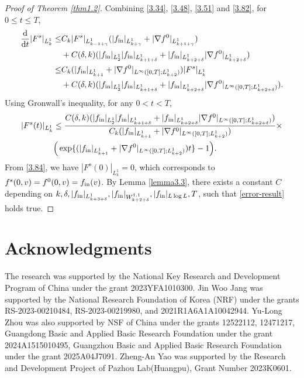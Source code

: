 \documentclass[reqno,10pt]{amsart}
\def\grad{\nabla}
\newcommand{\beq}{\begin{equation}}
\newcommand{\eeq}{\end{equation}}
\newcommand{\ben}{\begin{eqnarray}}
\newcommand{\een}{\end{eqnarray}}
\theoremstyle{definition}
\numberwithin{equation}{section}
\begin{document}
\begin{proof}[Proof of Theorem \ref{thm1.2}]
Combining \eqref{3.34}, \eqref{3.48}, \eqref{3.51} and \eqref{3.82}, for $0\le t\le T$,
$$
\begin{aligned}
\frac{\mathrm{d}}{\mathrm{d}t}|F^s|_{L^1_k}\le &C_k|F^s|_{L^1_{k-1+\gamma}}(|f_{\textup{in}}|_{L^1_{k+\gamma}}+|\grad f^0|_{L^1_{k+1+\gamma}})\\
&+C(\delta,k)(|f_{\textup{in}}|_{L^1_2}|f_{\textup{in}}|_{L^1_{k+1+\delta}}+|f_{\textup{in}}|_{L^1_{k+2+\delta}}|\grad f^0|_{L^1_{k+2+\delta}})\\
\le &
C_k(|f_{\textup{in}}|_{L^1_{k+1}}+|\grad f^0|_{L^{\infty}([0,T];L^1_{k+2})})|F^s|_{L^1_k}\\
&+C(\delta,k)(|f_{\textup{in}}|_{L^1_2}|f_{\textup{in}}|_{L^1_{k+1+\delta}}+|f_{\textup{in}}|_{L^1_{k+2+\delta}}|\grad f^0|_{L^\infty([0,T];L^1_{k+2+\delta})}).
\end{aligned}
$$
Using Gronwall's inequality, for any $0<t<T$,
\beq\label{3.84}
\begin{aligned}
|F^s(t)|_{L^1_k}&\le \frac{C(\delta,k)(|f_{\textup{in}}|_{L^1_2}|f_{\textup{in}}|_{L^1_{k+1+\delta}}+|f_{\textup{in}}|_{L^1_{k+2+\delta}}|\grad f^0|_{L^\infty([0,T];L^1_{k+2+\delta})})}{C_k(|f_{\textup{in}}|_{L^1_{k+1}}+|\grad f^0|_{L^{\infty}([0,T];L^1_{k+2})})}\times\\
&\Big(\exp\{(|f_{\textup{in}}|_{L^1_{k+1}}+|\grad f^0|_{L^{\infty}([0,T];L^1_{k+2})})t\}-1\Big).
\end{aligned}
\eeq
From \eqref{3.84}, we have $|F^s(0)|_{L^1_k}=0$, which corresponds to $f^s(0,v)=f^0(0,v)=f_{\textup{in}}(v)$.
By Lemma \ref{lemma3.3}, there exists a constant $C$ depending on $k,\delta,|f_{\textup{in}}|_{L^1_{k+3+\delta}},|f_{\textup{in}}|_{W^{1,1}_{k+2+\delta}},|f_{\textup{in}}|_{L\log L},T$, such that \eqref{error-result} holds true.
\end{proof}


\section*{Acknowledgments} 
The research was supported by the National Key Research and
Development Program of China under the grant  2023YFA1010300. 
Jin Woo Jang was supported by the National Research Foundation of Korea (NRF) under the grants RS-2023-00210484, RS-2023-00219980, and 2021R1A6A1A10042944. 
Yu-Long Zhou was also supported by NSF of China under the grants 12522112, 12471217,  Guangdong Basic and Applied Basic Research Foundation under the grant 2024A1515010495, Guangzhou Basic and Applied Basic Research Foundation under the grant 2025A04J7091. Zheng-An Yao was supported by the Research and Development Project of Pazhou Lab(Huangpu), Grant Number 2023K0601.




\end{document}
